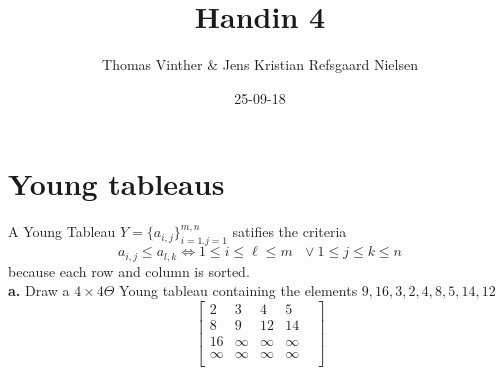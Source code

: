 \documentclass{article}
\theoremstyle{remark}
\numberwithin{equation}{section}
\begin{document}
	\author{Thomas Vinther \& Jens Kristian Refsgaard Nielsen}
	\title{Handin 4}
	\date{25-09-18}
	\maketitle
	\section*{Young tableaus}
A Young Tableau $Y=\{a_{i,j}\}_{i=1.j=1}^{m,n}$ satifies the criteria
\begin{equation}\label{YT}
	a_{i,j} \leq a_{l,k} \iff 1\leq i\leq\ell\leq m \text{ } \vee 1\leq j \leq k \leq n
\end{equation}	
because each row and column is sorted.\\
\textbf{a.} Draw a $4 \times 4 \Theta$ Young tableau containing the elements ${9,16,3,2,4,8,5,14,12}$
\\

$$\begin{bmatrix}
2       & 3 & 4 & 5  \\
8       & 9 & 12 & 14 &  \\
16      & \infty &\infty  &\infty \\
\infty	& \infty & \infty & \infty\\
\end{bmatrix}$$
\end{document}
